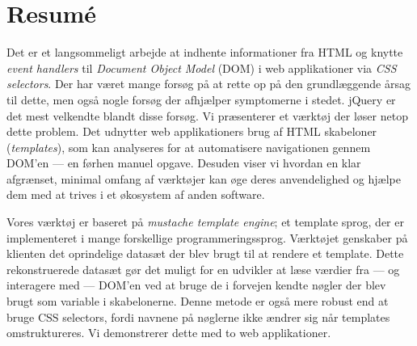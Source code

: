 \documentclass[thesis.tex]{subfiles}
\begin{document}
\chapter*{Resum\'e}
\label{chap:resume}

Det er et langsommeligt arbejde at indhente informationer fra HTML og
knytte \emph{event handlers} til \emph{Document Object Model} (DOM) i
web applikationer via \emph{CSS selectors}.
Der har været mange forsøg på at rette op på den grundlæggende årsag til dette,
men også nogle forsøg der afhjælper symptomerne i stedet.
jQuery er det mest velkendte blandt disse forsøg.
Vi præsenterer et værktøj der løser netop dette problem.
Det udnytter web applikationers brug af HTML skabeloner (\emph{templates}),
som kan analyseres for at automatisere navigationen gennem DOM'en
--- en førhen manuel opgave.
Desuden viser vi hvordan en klar afgrænset, minimal omfang af værktøjer
kan øge deres anvendelighed og hjælpe dem med at trives i et økosystem af
anden software.

Vores værktøj er baseret på \emph{mustache template engine}; et template sprog,
der er implementeret i mange forskellige programmeringssprog.
Værktøjet genskaber på klienten det oprindelige datasæt der blev brugt til at
rendere et template.
Dette rekonstruerede datasæt gør det muligt for en udvikler at læse værdier
fra --- og interagere med --- DOM'en ved at bruge de i forvejen kendte nøgler
der blev brugt som variable i skabelonerne.
Denne metode er også mere robust end at bruge CSS selectors,
fordi navnene på nøglerne ikke ændrer sig når templates omstruktureres.
Vi demonstrerer dette med to web applikationer.
\end{document}
